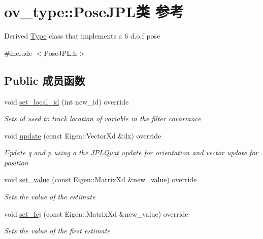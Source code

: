 \hypertarget{classov__type_1_1PoseJPL}{}\section{ov\+\_\+type\+:\+:Pose\+J\+P\+L类 参考}
\label{classov__type_1_1PoseJPL}


Derived \hyperlink{classov__type_1_1Type}{Type} class that implements a 6 d.\+o.\+f pose  




{\ttfamily \#include $<$Pose\+J\+P\+L.\+h$>$}

\subsection*{Public 成员函数}
\begin{DoxyCompactItemize}
\item 
void \hyperlink{classov__type_1_1PoseJPL_a2295d3fbdd9529c1464957961a886731}{set\+\_\+local\+\_\+id} (int new\+\_\+id) override
\begin{DoxyCompactList}\small\item\em Sets id used to track location of variable in the filter covariance \end{DoxyCompactList}\item 
void \hyperlink{classov__type_1_1PoseJPL_a8c961e8638cdc37a2b37c1fa50fc67a2}{update} (const Eigen\+::\+Vector\+Xd \&dx) override
\begin{DoxyCompactList}\small\item\em Update q and p using a the \hyperlink{classov__type_1_1JPLQuat}{J\+P\+L\+Quat} update for orientation and vector update for position \end{DoxyCompactList}\item 
void \hyperlink{classov__type_1_1PoseJPL_a203f719544e8f3e11eb74b1b1458e3d6}{set\+\_\+value} (const Eigen\+::\+Matrix\+Xd \&new\+\_\+value) override
\begin{DoxyCompactList}\small\item\em Sets the value of the estimate \end{DoxyCompactList}\item 
void \hyperlink{classov__type_1_1PoseJPL_aa20a30cf44fefdb749565c0e60fe027a}{set\+\_\+fej} (const Eigen\+::\+Matrix\+Xd \&new\+\_\+value) override
\begin{DoxyCompactList}\small\item\em Sets the value of the first estimate \end{DoxyCompactList}\item 

\end{DoxyCompactItemize}
